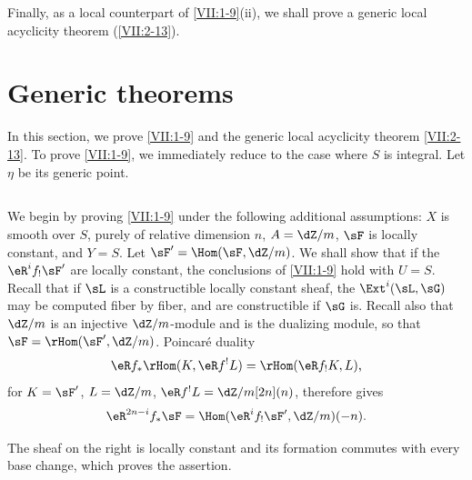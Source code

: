 Finally, as a local counterpart of \ref{VII:1-9}(ii), we shall prove a
generic local acyclicity theorem (\ref{VII:2-13}).











\section{Generic theorems}\label{VII:2}

In this section, we prove \ref{VII:1-9} and the generic local acyclicity theorem
\ref{VII:2-13}. To prove \ref{VII:1-9}, we immediately reduce to the case where
$S$ is integral. Let $\eta$ be its generic point.





\subsection{}\label{VII:2-1}

We begin by proving \ref{VII:1-9} under the following additional assumptions:
$X$ is smooth over $S$, purely of relative dimension $n$, $A=\dZ/m$, $\sF$ is
locally constant, and $Y=S$. Let $\sF'=\Hom(\sF,\dZ/m)$. We shall show that if
the $\eR^i f_! \sF'$ are locally constant, the conclusions of \ref{VII:1-9}
hold with $U=S$. Recall that if $\sL$ is a constructible locally constant
sheaf, the $\Ext^i(\sL,\sG)$ may be computed fiber by fiber, and are
constructible if $\sG$ is. Recall also that $\dZ/m$ is an injective
$\dZ/m$-module and is the dualizing module, so that
$\sF=\rHom(\sF',\dZ/m)$. Poincaré duality
\[
  \eR f_\ast \rHom(K,\eR f^! L) = \rHom(\eR f_! K,L) \text{,} 
\]
for $K=\sF'$, $L=\dZ/m$, $\eR f^! L = \dZ/m[2n](n)$, therefore gives
\[
  \eR^{2n-i} f_\ast \sF = \Hom(\eR^i f_! \sF',\dZ/m)(-n) \text{.} 
\]

The sheaf on the right is locally constant and its formation commutes with
every base change, which proves the assertion.





\subsection{}\label{VII:2-2}

